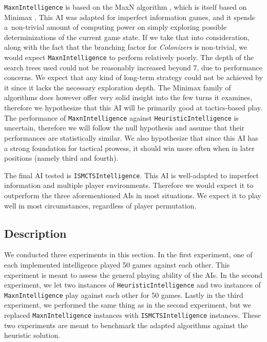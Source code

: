\texttt{MaxnIntelligence} is based on the MaxN algorithm \cite{Luckhardt86}, which
is itself based on Minimax \cite{Millington09}. This AI was adapted for imperfect
information games, and it spends a~non-trivial amount of computing power
on simply exploring possible determinizations of the current game state.
If we take that into consideration, along with the fact that the branching factor
for \emph{Colonizers} is non-trivial, we would expect \texttt{MaxnIntelligence}
to perform relatively poorly. The depth of the search trees used could not be
reasonably increased beyond 7, due to performance concerns. We expect that any kind of
long-term strategy could not be achieved by it since it lacks the necessary
exploration depth. The Minimax family of algorithms does however offer very
solid insight into the few turns it examines, therefore we hypothesize that this AI will be
primarily good at tactics-based play. The performance of \texttt{MaxnIntelligence}
against \texttt{HeuristicIntelligence} is uncertain, therefore we will follow the null
hypothesis and assume that their performances are statistically similar.
We also hypothesize that since this AI has a strong foundation for tactical prowess,
it should win more often when in later positions (namely third and fourth).

The final AI tested is \texttt{ISMCTSIntelligence}. This AI is well-adapted to
imperfect information and multiple player environments. Therefore we would expect
it to outperform the three aforementioned AIs in most situations. We expect it
to play well in most circumstances, regardless of player permutation.

\subsection{Description}

We conducted three experiments in this section. In the first experiment, one of each
implemented intelligence played 50 games against each other. This experiment is meant
to assess the general playing ability of the AIs. In the second experiment, we
let two instances of \texttt{HeuristicIntelligence} and two instances of
\texttt{MaxnIntelligence} play against each other for 50 games.
Lastly in the third experiment, we performed the same thing as in the second experiment,
but we replaced \texttt{MaxnIntelligence} instances with \texttt{ISMCTSIntelligence}
instances. These two experiments are meant to benchmark the adapted algorithms
against the heuristic solution.

